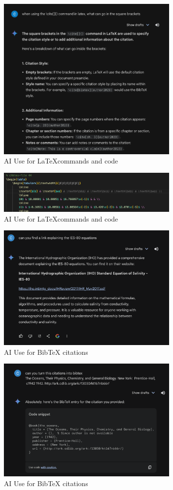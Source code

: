 \begin{figure}[ht]
    \centering
    \includegraphics[width=0.8\textwidth]{Figures/AI_Use/latex_help}
    \caption{AI Use for \LaTeX commands and code}
\end{figure}
\begin{figure}[ht]
    \centering
    \includegraphics[width=0.8\textwidth]{Figures/AI_Use/code_completion}
    \caption{AI Use for \LaTeX commands and code}
\end{figure}
\begin{figure}[ht]
    \centering
    \includegraphics[width=0.8\textwidth]{Figures/AI_Use/cite_helping}
    \caption{AI Use for BibTeX citations}
\end{figure}
\begin{figure}[ht]
    \centering
    \includegraphics[width=0.8\textwidth]{Figures/AI_Use/bibtex_citing}
    \caption{AI Use for BibTeX citations}
\end{figure}